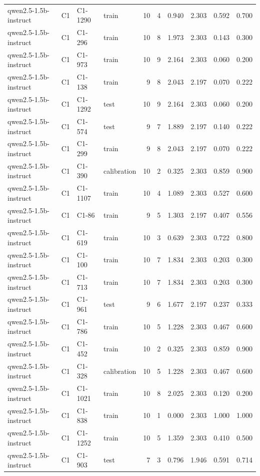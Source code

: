 \begin{table}
\begin{tabular}{llllrrrrrr}
qwen2.5-1.5b-instruct & C1 & C1-1290 & train & 10 & 4 & 0.940 & 2.303 & 0.592 & 0.700 \\
qwen2.5-1.5b-instruct & C1 & C1-296 & train & 10 & 8 & 1.973 & 2.303 & 0.143 & 0.300 \\
qwen2.5-1.5b-instruct & C1 & C1-973 & train & 10 & 9 & 2.164 & 2.303 & 0.060 & 0.200 \\
qwen2.5-1.5b-instruct & C1 & C1-138 & train & 9 & 8 & 2.043 & 2.197 & 0.070 & 0.222 \\
qwen2.5-1.5b-instruct & C1 & C1-1292 & test & 10 & 9 & 2.164 & 2.303 & 0.060 & 0.200 \\
qwen2.5-1.5b-instruct & C1 & C1-574 & test & 9 & 7 & 1.889 & 2.197 & 0.140 & 0.222 \\
qwen2.5-1.5b-instruct & C1 & C1-299 & train & 9 & 8 & 2.043 & 2.197 & 0.070 & 0.222 \\
qwen2.5-1.5b-instruct & C1 & C1-390 & calibration & 10 & 2 & 0.325 & 2.303 & 0.859 & 0.900 \\
qwen2.5-1.5b-instruct & C1 & C1-1107 & train & 10 & 4 & 1.089 & 2.303 & 0.527 & 0.600 \\
qwen2.5-1.5b-instruct & C1 & C1-86 & train & 9 & 5 & 1.303 & 2.197 & 0.407 & 0.556 \\
qwen2.5-1.5b-instruct & C1 & C1-619 & train & 10 & 3 & 0.639 & 2.303 & 0.722 & 0.800 \\
qwen2.5-1.5b-instruct & C1 & C1-100 & train & 10 & 7 & 1.834 & 2.303 & 0.203 & 0.300 \\
qwen2.5-1.5b-instruct & C1 & C1-713 & train & 10 & 7 & 1.834 & 2.303 & 0.203 & 0.300 \\
qwen2.5-1.5b-instruct & C1 & C1-961 & test & 9 & 6 & 1.677 & 2.197 & 0.237 & 0.333 \\
qwen2.5-1.5b-instruct & C1 & C1-786 & train & 10 & 5 & 1.228 & 2.303 & 0.467 & 0.600 \\
qwen2.5-1.5b-instruct & C1 & C1-452 & train & 10 & 2 & 0.325 & 2.303 & 0.859 & 0.900 \\
qwen2.5-1.5b-instruct & C1 & C1-328 & calibration & 10 & 5 & 1.228 & 2.303 & 0.467 & 0.600 \\
qwen2.5-1.5b-instruct & C1 & C1-1021 & train & 10 & 8 & 2.025 & 2.303 & 0.120 & 0.200 \\
qwen2.5-1.5b-instruct & C1 & C1-838 & train & 10 & 1 & 0.000 & 2.303 & 1.000 & 1.000 \\
qwen2.5-1.5b-instruct & C1 & C1-1252 & train & 10 & 5 & 1.359 & 2.303 & 0.410 & 0.500 \\
qwen2.5-1.5b-instruct & C1 & C1-903 & test & 7 & 3 & 0.796 & 1.946 & 0.591 & 0.714 \\

\end{tabular}
\end{table}
